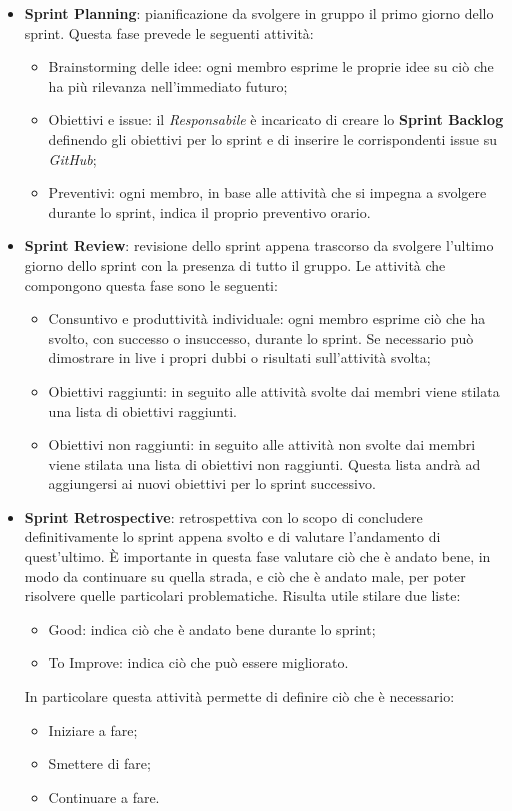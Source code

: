 \begin{itemize}
  \item \textbf{Sprint Planning}: pianificazione da svolgere in gruppo il primo giorno dello sprint. Questa fase prevede le seguenti attività:
  \begin{itemize}
    \item Brainstorming delle idee: ogni membro esprime le proprie idee su ciò che ha più rilevanza nell'immediato futuro;
    \item Obiettivi e issue: il \textit{Responsabile} è incaricato di creare lo \textbf{Sprint Backlog} definendo gli obiettivi per lo sprint e di inserire le corrispondenti issue su \textit{GitHub};
    \item Preventivi: ogni membro, in base alle attività che si impegna a svolgere durante lo sprint, indica il proprio preventivo orario.
  \end{itemize}
  \item \textbf{Sprint Review}: revisione dello sprint appena trascorso da svolgere l'ultimo giorno dello sprint con la presenza di tutto il gruppo. Le attività che compongono questa fase sono le seguenti:
  \begin{itemize}
    \item Consuntivo e produttività individuale: ogni membro esprime ciò che ha svolto, con successo o insuccesso, durante lo sprint. Se necessario può dimostrare in live i propri dubbi o risultati sull'attività svolta;
    \item Obiettivi raggiunti: in seguito alle attività svolte dai membri viene stilata una lista di obiettivi raggiunti.
    \item Obiettivi non raggiunti: in seguito alle attività non svolte dai membri viene stilata una lista di obiettivi non raggiunti. Questa lista andrà ad aggiungersi ai nuovi obiettivi per lo sprint successivo.
  \end{itemize}
  \item \textbf{Sprint Retrospective}: retrospettiva con lo scopo di concludere definitivamente lo sprint appena svolto e di valutare l'andamento di quest'ultimo. È importante in questa fase valutare ciò che è andato bene, in modo da continuare su quella strada, e ciò che è andato male, per poter risolvere quelle particolari problematiche. Risulta utile stilare due liste:
  \begin{itemize}
    \item Good: indica ciò che è andato bene durante lo sprint;
    \item To Improve: indica ciò che può essere migliorato.
  \end{itemize}
  In particolare questa attività permette di definire ciò che è necessario:
  \begin{itemize}
    \item Iniziare a fare;
    \item Smettere di fare;
    \item Continuare a fare.
  \end{itemize}
\end{itemize}

